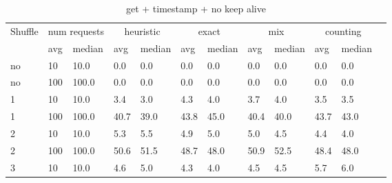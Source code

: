 \documentclass[a4paper]{report}
\begin{document}
\begin{table}[h]
	\centering
	\caption{get + timestamp + no keep alive}
	\label{tab:get}
	\begin{tabular}{|l|l|l|l|l|l|l|l|l|l|l|l|}
		\hline
		\multirow{2}{*}{Shuffle} & \multicolumn{2}{|c|}{num requests} & \multicolumn{2}{|c|}{heuristic} & \multicolumn{2}{|c|}{exact} & \multicolumn{2}{|c|}{mix} & \multicolumn{2}{|c|}{counting}                                          \\ \cline{2-11}
		                         & avg                                & median                          & avg                         & median                    & avg                            & median & avg  & median & avg  & median \\ \hline
		no                       & 10                                 & 10.0                            & 0.0                         & 0.0                       & 0.0                            & 0.0    & 0.0  & 0.0    & 0.0  & 0.0    \\ \hline
		no                       & 100                                & 100.0                           & 0.0                         & 0.0                       & 0.0                            & 0.0    & 0.0  & 0.0    & 0.0  & 0.0    \\ \hline
		1                        & 10                                 & 10.0                            & 3.4                         & 3.0                       & 4.3                            & 4.0    & 3.7  & 4.0    & 3.5  & 3.5    \\ \hline
		1                        & 100                                & 100.0                           & 40.7                        & 39.0                      & 43.8                           & 45.0   & 40.4 & 40.0   & 43.7 & 43.0   \\ \hline
		2                        & 10                                 & 10.0                            & 5.3                         & 5.5                       & 4.9                            & 5.0    & 5.0  & 4.5    & 4.4  & 4.0    \\ \hline
		2                        & 100                                & 100.0                           & 50.6                        & 51.5                      & 48.7                           & 48.0   & 50.9 & 52.5   & 48.4 & 48.0   \\ \hline
		3                        & 10                                 & 10.0                            & 4.6                         & 5.0                       & 4.3                            & 4.0    & 4.5  & 4.5    & 5.7  & 6.0    \\ \hline

\end{tabular}
\end{table}
\end{document}
